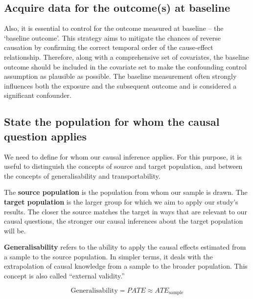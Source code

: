 \documentclass[
  singlecolumn]{report}
\begin{document}
\hypertarget{acquire-data-for-the-outcomes-at-baseline}{%
\subsection{\texorpdfstring{\textbf{Acquire data for the outcome(s) at
baseline}}{Acquire data for the outcome(s) at baseline}}\label{acquire-data-for-the-outcomes-at-baseline}}

Also, it is essential to control for the outcome measured at baseline --
the `baseline outcome'. This strategy aims to mitigate the chances of
reverse causation by confirming the correct temporal order of the
cause-effect relationship. Therefore, along with a comprehensive set of
covariates, the baseline outcome should be included in the covariate set
to make the confounding control assumption as plausible as possible. The
baseline measurement often strongly influences both the exposure and the
subsequent outcome and is considered a significant confounder.

\hypertarget{state-the-population-for-whom-the-causal-question-applies}{%
\subsection{\texorpdfstring{\textbf{State the population for whom the
causal question
applies}}{State the population for whom the causal question applies}}\label{state-the-population-for-whom-the-causal-question-applies}}

We need to define for whom our causal inference applies. For this
purpose, it is useful to distinguish the concepts of source and target
population, and between the concepts of generalisability and
transportability.

The \textbf{source population} is the population from whom our sample is
drawn. The \textbf{target population} is the larger group for which we
aim to apply our study's results. The closer the source matches the
target in ways that are relevant to our causal questions, the stronger
our causal inferences about the target population will be.

\textbf{Generalisability} refers to the ability to apply the causal
effects estimated from a sample to the source population. In simpler
terms, it deals with the extrapolation of causal knowledge from a sample
to the broader population. This concept is also called ``external
validity.''

\[\text{Generalisability} = PATE \approx ATE_{\text{sample}}\]
\end{document}
